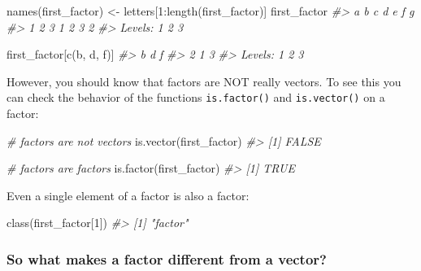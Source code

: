 \documentclass[
]{book}
\newenvironment{Shaded}{\begin{snugshade}}{\end{snugshade}}
\newcommand{\CommentTok}[1]{\textcolor[rgb]{0.56,0.35,0.01}{\textit{#1}}}
\newcommand{\DecValTok}[1]{\textcolor[rgb]{0.00,0.00,0.81}{#1}}
\newcommand{\FunctionTok}[1]{\textcolor[rgb]{0.00,0.00,0.00}{#1}}
\newcommand{\NormalTok}[1]{#1}
\newcommand{\OtherTok}[1]{\textcolor[rgb]{0.56,0.35,0.01}{#1}}
\newcommand{\SpecialCharTok}[1]{\textcolor[rgb]{0.00,0.00,0.00}{#1}}
\newcommand{\StringTok}[1]{\textcolor[rgb]{0.31,0.60,0.02}{#1}}
\begin{document}
\begin{Shaded}
\begin{Highlighting}[]
\FunctionTok{names}\NormalTok{(first\_factor) }\OtherTok{\textless{}{-}}\NormalTok{ letters[}\DecValTok{1}\SpecialCharTok{:}\FunctionTok{length}\NormalTok{(first\_factor)]}
\NormalTok{first\_factor}
\CommentTok{\#\textgreater{} a b c d e f g }
\CommentTok{\#\textgreater{} 1 2 3 1 2 3 2 }
\CommentTok{\#\textgreater{} Levels: 1 2 3}

\NormalTok{first\_factor[}\FunctionTok{c}\NormalTok{(}\StringTok{\textquotesingle{}b\textquotesingle{}}\NormalTok{, }\StringTok{\textquotesingle{}d\textquotesingle{}}\NormalTok{, }\StringTok{\textquotesingle{}f\textquotesingle{}}\NormalTok{)]}
\CommentTok{\#\textgreater{} b d f }
\CommentTok{\#\textgreater{} 2 1 3 }
\CommentTok{\#\textgreater{} Levels: 1 2 3}
\end{Highlighting}
\end{Shaded}

However, you should know that factors are NOT really vectors. To see this you
can check the behavior of the functions \texttt{is.factor()} and \texttt{is.vector()} on a
factor:

\begin{Shaded}
\begin{Highlighting}[]
\CommentTok{\# factors are not vectors}
\FunctionTok{is.vector}\NormalTok{(first\_factor)}
\CommentTok{\#\textgreater{} [1] FALSE}

\CommentTok{\# factors are factors}
\FunctionTok{is.factor}\NormalTok{(first\_factor)}
\CommentTok{\#\textgreater{} [1] TRUE}
\end{Highlighting}
\end{Shaded}

Even a single element of a factor is also a factor:

\begin{Shaded}
\begin{Highlighting}[]
\FunctionTok{class}\NormalTok{(first\_factor[}\DecValTok{1}\NormalTok{])}
\CommentTok{\#\textgreater{} [1] "factor"}
\end{Highlighting}
\end{Shaded}

\hypertarget{so-what-makes-a-factor-different-from-a-vector}{%
\subsubsection*{So what makes a factor different from a vector?}\label{so-what-makes-a-factor-different-from-a-vector}}
\end{document}
